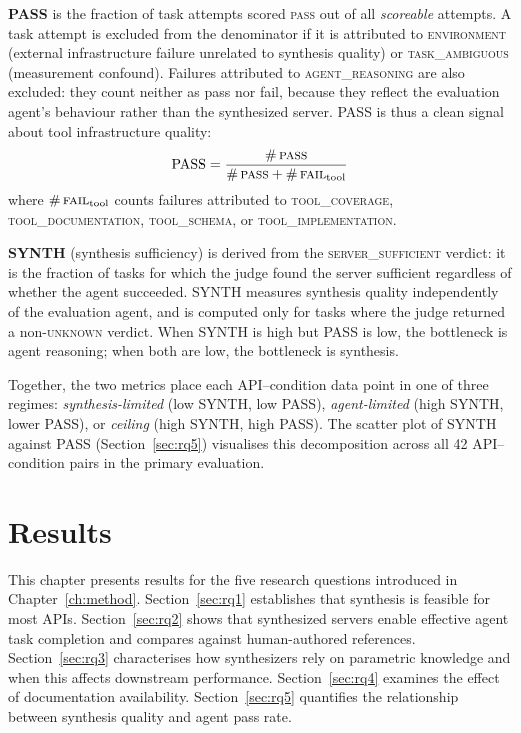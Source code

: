 \documentclass[12pt]{report}
\begin{document}
\textbf{PASS} is the fraction of task attempts scored \textsc{pass} out of
all \emph{scoreable} attempts. A task attempt is excluded from the denominator
if it is attributed to \textsc{environment} (external infrastructure failure
unrelated to synthesis quality) or \textsc{task\_ambiguous} (measurement
confound). Failures attributed to \textsc{agent\_reasoning} are also excluded:
they count neither as pass nor fail, because they reflect the evaluation
agent's behaviour rather than the synthesized server. PASS is thus a clean
signal about tool infrastructure quality:
%
\begin{equation}
  \text{PASS}
  = \frac{\#\,\textsc{pass}}
    {\#\,\textsc{pass} + \#\,\textsc{fail}_{\text{tool}}}
  \label{eq:pass}
\end{equation}
%
where $\#\,\textsc{fail}_{\text{tool}}$ counts failures attributed to
\textsc{tool\_coverage}, \textsc{tool\_documentation},
\textsc{tool\_schema}, or \textsc{tool\_implementation}.

\textbf{SYNTH} (synthesis sufficiency) is derived from the
\textsc{server\_sufficient} verdict: it is the fraction of tasks for which
the judge found the server sufficient regardless of whether the agent
succeeded. SYNTH measures synthesis quality independently of the evaluation
agent, and is computed only for tasks where the judge returned a
non-\textsc{unknown} verdict. When SYNTH is high but PASS is low, the
bottleneck is agent reasoning; when both are low, the bottleneck is synthesis.

Together, the two metrics place each API--condition data point in one of
three regimes: \emph{synthesis-limited} (low SYNTH, low PASS),
\emph{agent-limited} (high SYNTH, lower PASS), or \emph{ceiling} (high SYNTH,
high PASS). The scatter plot of SYNTH against PASS (Section~\ref{sec:rq5})
visualises this decomposition across all 42 API--condition pairs in the
primary evaluation.

\chapter{Results}
\label{ch:results}

This chapter presents results for the five research questions introduced in
Chapter~\ref{ch:method}. Section~\ref{sec:rq1} establishes that synthesis
is feasible for most APIs. Section~\ref{sec:rq2} shows that synthesized
servers enable effective agent task completion and compares against
human-authored references. Section~\ref{sec:rq3} characterises how
synthesizers rely on parametric knowledge and when this affects downstream
performance. Section~\ref{sec:rq4} examines the effect of documentation
availability. Section~\ref{sec:rq5} quantifies the relationship between
synthesis quality and agent pass rate.
\end{document}
